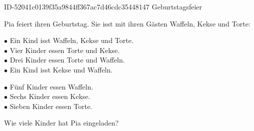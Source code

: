 \begin{exercise}
      {ID-52041c0139f35a9844ff367ac7d46cdc35448147}
      {Geburtstagsfeier}
  \ifproblem\problem\par
    Pia feiert ihren Geburtstag. Sie isst mit ihren Gästen Waffeln, Kekse
    und Torte:\par
    \begin{minipage}[t]{0.52\textwidth}
      $\bullet$ Ein Kind isst Waffeln, Kekse und Torte.\\[1ex]
      $\bullet$ Vier Kinder essen Torte und Kekse.\\[1ex]
      $\bullet$ Drei Kinder essen Torte und Waffeln.\\[1ex]
      $\bullet$ Ein Kind isst Kekse und Waffeln.
    \end{minipage}\hfill
    \begin{minipage}[t]{0.45\textwidth}
      $\bullet$ Fünf Kinder essen Waffeln.\\[1ex]
      $\bullet$ Sechs Kinder essen Kekse.\\[1ex]
      $\bullet$ Sieben Kinder essen Torte.
    \end{minipage}\bigskip\par
    Wie viele Kinder hat Pia eingeladen?
  \fi
\end{exercise}
